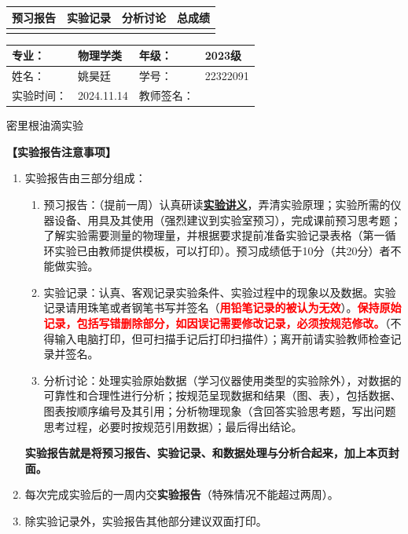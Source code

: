 \documentclass[dvipsnames, svgnames,a4paper,11pt]{article}
\begin{document}
\begin{table}
	\renewcommand\arraystretch{1.7}
	\begin{tabularx}{\textwidth}{
		|X|X|X|X
		|X|X|X|X|}
	\hline
	\multicolumn{2}{|c|}{预习报告}&\multicolumn{2}{|c|}{实验记录}&\multicolumn{2}{|c|}{分析讨论}&\multicolumn{2}{|c|}{总成绩}\\
	\hline
	 & &  & &  & &  & \\
	\hline
	\end{tabularx}
\end{table}


\begin{table}
	\renewcommand\arraystretch{1.7}
	\begin{tabularx}{\textwidth}{|X|X|X|X|}
	\hline
	专业：& 物理学类 &年级：& 2023级\\
	\hline
	姓名：& 姚昊廷  & 学号：&22322091\\
	\hline
	实验时间：& 2024.11.14& 教师签名：& \\
	\hline
	\end{tabularx}
\end{table}

\begin{center}
	\LARGE 密里根油滴实验
\end{center}

\textbf{【实验报告注意事项】}
\begin{enumerate}
	\item 实验报告由三部分组成：
	\begin{enumerate}
		\item 预习报告：（提前一周）认真研读\underline{\textbf{实验讲义}}，弄清实验原理；实验所需的仪器设备、用具及其使用（强烈建议到实验室预习），完成课前预习思考题；了解实验需要测量的物理量，并根据要求提前准备实验记录表格（第一循环实验已由教师提供模板，可以打印）。预习成绩低于10分（共20分）者不能做实验。
	    \item 实验记录：认真、客观记录实验条件、实验过程中的现象以及数据。实验记录请用珠笔或者钢笔书写并签名（\textcolor{red}{\textbf{用铅笔记录的被认为无效}}）。\textcolor{red}{\textbf{保持原始记录，包括写错删除部分，如因误记需要修改记录，必须按规范修改。}}（不得输入电脑打印，但可扫描手记后打印扫描件）；离开前请实验教师检查记录并签名。
	    \item 分析讨论：处理实验原始数据（学习仪器使用类型的实验除外），对数据的可靠性和合理性进行分析；按规范呈现数据和结果（图、表），包括数据、图表按顺序编号及其引用；分析物理现象（含回答实验思考题，写出问题思考过程，必要时按规范引用数据）；最后得出结论。
	\end{enumerate}
	\textbf{实验报告就是将预习报告、实验记录、和数据处理与分析合起来，加上本页封面。}
	\item 每次完成实验后的一周内交\textbf{实验报告}（特殊情况不能超过两周）。
	\item 除实验记录外，实验报告其他部分建议双面打印。
\end{enumerate}
\end{document}

